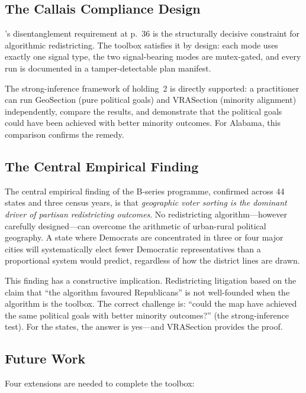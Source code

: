 \subsection{The Callais Compliance Design}

\callais{}'s disentanglement requirement at p.~36 is the structurally decisive
constraint for algorithmic redistricting.
The toolbox satisfies it by design: each mode uses exactly one signal type,
the two signal-bearing modes are mutex-gated, and every run is documented in
a tamper-detectable plan manifest.

The strong-inference framework of \callais{} holding~2 is directly supported:
a practitioner can run GeoSection (pure political goals) and VRASection (minority
alignment) independently, compare the results, and demonstrate that the political
goals could have been achieved with better minority outcomes.
For Alabama, this comparison confirms the \allenmilligan{} remedy.

\subsection{The Central Empirical Finding}

The central empirical finding of the B-series programme, confirmed across 44
states and three census years, is that
\emph{geographic voter sorting is the dominant driver of partisan redistricting outcomes}.
No redistricting algorithm---however carefully designed---can overcome the
arithmetic of urban-rural political geography.
A state where Democrats are concentrated in three or four major cities will
systematically elect fewer Democratic representatives than a proportional system
would predict, regardless of how the district lines are drawn.

This finding has a constructive implication.
Redistricting litigation based on the claim that ``the algorithm favoured
Republicans'' is not well-founded when the algorithm is the toolbox.
The correct challenge is: ``could the map have achieved the same political goals
with better minority outcomes?'' (the \callais{} strong-inference test).
For the \allenmilligan{} states, the answer is yes---and VRASection provides
the proof.

\subsection{Future Work}

Four extensions are needed to complete the toolbox:

